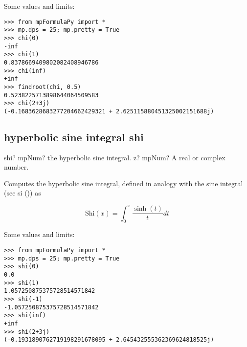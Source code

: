 Some values and limits:

\begin{lstlisting}
>>> from mpFormulaPy import *
>>> mp.dps = 25; mp.pretty = True
>>> chi(0)
-inf
>>> chi(1)
0.8378669409802082408946786
>>> chi(inf)
+inf
>>> findroot(chi, 0.5)
0.5238225713898644064509583
>>> chi(2+3j)
(-0.1683628683277204662429321 + 2.625115880451325002151688j)
\end{lstlisting}



\subsection{hyperbolic sine integral shi}

\begin{mpFunctionsExtract}
	\mpFunctionOne
	{shi? mpNum? the hyperbolic sine integral.}
	{z? mpNum? A real or complex number.}
\end{mpFunctionsExtract}


\vpara
Computes the hyperbolic sine integral, defined in analogy with the sine integral (see si ()) as

\begin{equation}
\text{Shi}(x)= \int_0^{x} \frac{\sinh(t)}{t} dt 
\end{equation}


Some values and limits:

\begin{lstlisting}
>>> from mpFormulaPy import *
>>> mp.dps = 25; mp.pretty = True
>>> shi(0)
0.0
>>> shi(1)
1.057250875375728514571842
>>> shi(-1)
-1.057250875375728514571842
>>> shi(inf)
+inf
>>> shi(2+3j)
(-0.1931890762719198291678095 + 2.645432555362369624818525j)
\end{lstlisting}


